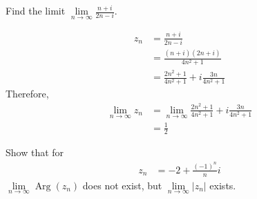 \documentclass[titlepage, fleqn, a4paper, 12pt, twoside]{article}
\theoremstyle{definition}
\theoremstyle{theorem}
\DeclareMathOperator{\Arg}{Arg}
\begin{document}
\begin{question}
	Find the limit $\lim\limits_{n \to \infty} \frac{n + i}{2 n - i}$.
\end{question}

\begin{solution}
	\begin{align*}
		z_n & = \frac{n + i}{2 n - i}               \\
                    & = \frac{(n + i) (2 n + i)}{4 n^2 + 1} \\
                    & = \frac{2 n^2 + 1}{4 n^2 + 1} + i \frac{3 n}{4 n^2 + 1}
	\end{align*}
	Therefore,
	\begin{align*}
		\lim\limits_{n \to \infty} z_n & = \lim\limits_{n \to \infty} \frac{2 n^2 + 1}{4 n^2 + 1} + i \frac{3 n}{4 n^2 + 1} \\
                                               & = \frac{1}{2}
	\end{align*}
\end{solution}

\begin{question}
	Show that for
	\begin{align*}
		z_n & = -2 + \frac{(-1)^n}{n} i
	\end{align*}
	$\lim\limits_{n \to \infty} \Arg(z_n)$ does not exist, but $\lim\limits_{n \to \infty} |z_n|$ exists.
\end{question}
\end{document}
